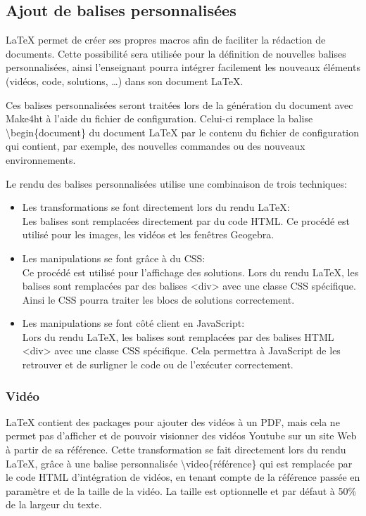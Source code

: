 \documentclass[12pt,titlepage,oneside]{article}
\begin{document}
\subsection{Ajout de balises personnalisées}
LaTeX permet de créer ses propres macros afin de faciliter la rédaction de documents. Cette possibilité sera utilisée pour la définition de nouvelles balises personnalisées, ainsi l'enseignant pourra intégrer facilement les nouveaux éléments (vidéos, code, solutions, \dots) dans son document LaTeX.\par
Ces balises personnalisées seront traitées lors de la génération du document avec Make4ht à l'aide du fichier de configuration. Celui-ci remplace la balise \textbackslash begin\{document\} du document LaTeX par le contenu du fichier de configuration qui contient, par exemple, des nouvelles commandes ou des nouveaux environnements.\par
Le rendu des balises personnalisées utilise une combinaison de trois techniques:
\begin{itemize}
\item Les transformations se font directement lors du rendu LaTeX:\\
Les balises sont remplacées directement par du code HTML. Ce procédé est utilisé pour les images, les vidéos et les fenêtres Geogebra.
\item Les manipulations se font grâce à du CSS:\\
Ce procédé est utilisé pour l'affichage des solutions. Lors du rendu LaTeX, les balises sont remplacées par des balises <div> avec une classe CSS spécifique. Ainsi le CSS pourra traiter les blocs de solutions correctement.
\item Les manipulations se font côté client en JavaScript:\\
Lors du rendu LaTeX, les balises sont remplacées par des balises HTML <div> avec une classe CSS spécifique. Cela permettra à JavaScript de les retrouver et de surligner le code ou de l'exécuter correctement.
\end{itemize}

\subsubsection{Vidéo}
LaTeX contient des packages pour ajouter des vidéos à un PDF, mais cela ne permet pas d'afficher et de pouvoir visionner des vidéos Youtube sur un site Web à partir de sa référence. Cette transformation se fait directement lors du rendu LaTeX, grâce à une balise personnalisée \textbackslash video\{référence\} qui est remplacée par le code HTML d'intégration de vidéos, en tenant compte de la référence passée en paramètre et de la taille de la vidéo. La taille est optionnelle et par défaut à 50\% de la largeur du texte.\par
\end{document}
